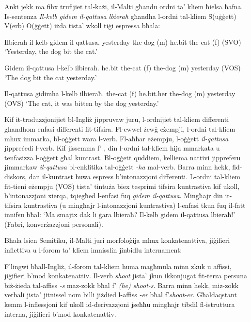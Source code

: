 \documentclass[]{../../metanetpaper}
\begin{document}
\begin{multicols}{2}

Anki jekk ma fihx trufijiet tal-każi, il-Malti għandu ordni ta’ kliem ħielsa ħafna. Is-sentenza \emph{Il-kelb gidem il-qattusa lbieraħ} għandha l-ordni tal-kliem S(uġġett) V(erb) O(ġġett) iżda tista’ wkoll tiġi espressa bħala:

\begin{examples}\label{WO_no_clitics}
\item
\gll Ilbieraħ il-kelb gidem il-qattusa.
yesterday	{the-dog (m)} he.bit	{the-cat (f)}
\gln (SVO)
\glt `Yesterday, the dog bit the cat.'
\glend

\item
\gll Gidem il-qattusa l-kelb ilbieraħ.
he.bit {the-cat (f)} {the-dog (m)} yesterday
\gln (VOS)
\glt `The dog bit the cat yesterday.'
\glend

\item
\gll Il-qattusa gidimha l-kelb ilbieraħ.
{the-cat (f)} he.bit.her {the-dog (m)} yesterday
\gln (OVS)
\glt `The cat, it was bitten by the dog yesterday.'
\glend
\end{examples}

Kif it-traduzzjonijiet bl-Ingliż jippruvaw juru, l-ordnijiet tal-kliem differenti għandhom enfasi differenti fit-tifsira. Fl-ewwel żewġ eżempji, l-ordni tal-kliem mhux immarka, bl-oġġett wara l-verb. Fl-aħħar eżempju, l-oġġett \emph{il-qattusa} jippreċedi l-verb. Kif jissemma f' \cite[p. 140]{Fabri:1993}, din l-ordni tal-kliem hija mmarkata u tenfasizza l-oġġett għal kuntrast. Bl-oġġett quddiem, kelliema nattivi jippreferu jimmarkaw \emph{il-qattusa} bl-enklitika tal-oġġett \emph{-ha} mal-verb. Barra minn hekk, fid-diskors, dan il-kuntrast huwa espress b’intonazzjoni differenti. L-ordni tal-kliem fit-tieni eżempju (VOS) tista’ tintuża biex tesprimi tifsira kuntrastiva kif ukoll, b’intonazzjoni xierqa, tqiegħed l-enfasi fuq \emph{gidem il-qattusa}. Mingħajr din it-tifsira kuntrastiva (u mingħajr l-intonazzjoni kuntrastiva) l-enfasi tkun fuq il-fatt innifsu bħal: `Ma smajtx dak li ġara lbieraħ? Il-kelb gidem il-qattusa lbieraħ!' (Fabri, konverżazzjoni personali).


Bħala lsien Semitiku, il-Malti juri morfoloġija mhux konkatenattiva, jiġifieri inflettiva u l-forom ta’ kliem imnisslin jinbidlu internament:

F’lingwi bħall-Ingliż, il-forom tal-kliem huma magħmula minn zkuk u affissi, jiġifieri b’mod konkatenattiv. Il-verb \emph{shoot} jista’ jkun ikkonjugat fit-terza persuna biż-żieda tal-affiss \emph{-s} maz-zokk bħal f’ \emph{(he) shoot-s}. Barra minn hekk, miz-zokk verbali jista’ jitnissel nom billi jiżdied l-affiss \emph{-er} bħal f’\emph{shoot-er}. Għaldaqstant kemm l-inflessjoni kif ukoll id-derivazzjoni jseħħu mingħajr tibdil fl-istruttura interna, jiġifieri b’mod konkatenattiv. 


\end{multicols}
\end{document}
